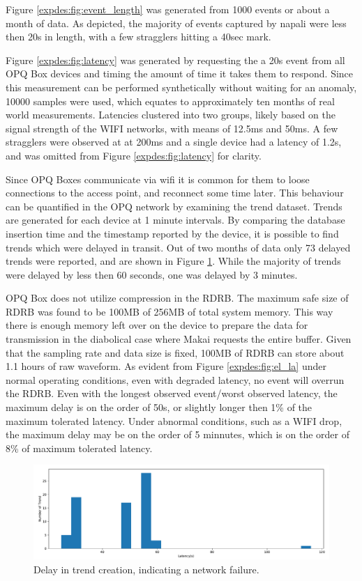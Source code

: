 Figure \ref{expdes:fig:event_length} was generated from 1000 events or about a month of data.
As depicted, the majority of events captured by napali were less then 20s in length, with a few stragglers hitting a 40sec mark.

Figure \ref{expdes:fig:latency} was generated by requesting the a 20s event from all OPQ Box devices and timing the amount of time it takes them to respond.
Since this measurement can be performed synthetically without waiting for an anomaly, 10000 samples were used, which equates to approximately ten months of real world measurements.
Latencies clustered into two groups, likely based on the signal strength of the WIFI networks, with means of 12.5ms and 50ms.
A few stragglers were observed at at 200ms and a single device had a latency of 1.2s, and was omitted from Figure \ref{expdes:fig:latency} for clarity.

Since OPQ Boxes communicate via wifi it is common for them to loose connections to the access point, and reconnect some time later.
This behaviour can be quantified in the OPQ network by examining the trend dataset.
Trends are generated for each device at 1 minute intervals.
By comparing the database insertion time and the timestamp reported by the device, it is possible to find trends which were delayed in transit.
Out of two months of data only 73 delayed trends were reported, and are shown in Figure \ref{expdes:fig:trend_latency}.
While the majority of trends were delayed by less then 60 seconds, one was delayed by 3 minutes.

OPQ Box does not utilize compression in the RDRB.
The maximum safe size of RDRB was found to be 100MB of 256MB of total system memory.
This way there is enough memory left over on the device to prepare the data for transmission in the diabolical case where Makai requests the entire buffer.
Given that the sampling rate and data size is fixed, 100MB of RDRB can store about 1.1 hours of raw waveform.
As evident from Figure \ref{expdes:fig:el_la} under normal operating conditions, even with degraded latency, no event will overrun the RDRB.
Even with the longest observed event/worst observed latency, the maximum delay is on the order of 50s, or slightly longer then 1\% of the maximum tolerated latency.
Under abnormal conditions, such as a WIFI drop, the maximum delay may be on the order of 5 minnutes, which is on the order of 8\% of maximum tolerated latency.

\begin{figure}[h]
    \centering
    \includegraphics[width=1\linewidth]{img/napali_eval/trend_latency.pdf}
    \caption{Delay in trend creation, indicating a network failure.}
    \label{expdes:fig:trend_latency}
\end{figure}


